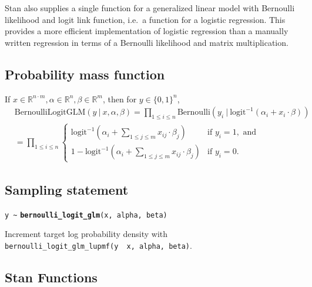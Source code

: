 \documentclass[
  10pt,
]{book}
\begin{document}
Stan also supplies a single function for a generalized linear model
with Bernoulli likelihood and logit link function, i.e.~a function
for a logistic regression. This provides a more efficient
implementation of logistic regression than a manually written
regression in terms of a Bernoulli likelihood and matrix
multiplication.

\hypertarget{probability-mass-function-2}{%
\subsection{Probability mass function}\label{probability-mass-function-2}}

If \(x\in \mathbb{R}^{n\cdot m}, \alpha \in \mathbb{R}^n, \beta\in \mathbb{R}^m\), then for \(y \in {\{0,1\}}^n\), \begin{align*}
&\text{BernoulliLogitGLM}(y~|~x, \alpha, \beta) = \prod_{1\leq i \leq
n}\text{Bernoulli}(y_i~|~\text{logit}^{-1}(\alpha_i + x_i\cdot
\beta))\\ &= \prod_{1\leq i \leq n} \left\{ \begin{array}{ll}
\text{logit}^{-1}(\alpha_i + \sum_{1\leq j\leq m}x_{ij}\cdot \beta_j)
& \text{if } y_i = 1, \text{ and} \\ 1 - \text{logit}^{-1}(\alpha_i +
\sum_{1\leq j\leq m}x_{ij}\cdot \beta_j) & \text{if } y_i = 0.
\end{array} \right. \end{align*}

\hypertarget{sampling-statement-2}{%
\subsection{Sampling statement}\label{sampling-statement-2}}

\texttt{y\ \textasciitilde{}} \textbf{\texttt{bernoulli\_logit\_glm}}\texttt{(x,\ alpha,\ beta)}

Increment target log probability density with \texttt{bernoulli\_logit\_glm\_lupmf(y\ \textbar{}\ x,\ alpha,\ beta)}.

\hypertarget{stan-functions-2}{%
\subsection{Stan Functions}\label{stan-functions-2}}

\end{document}
